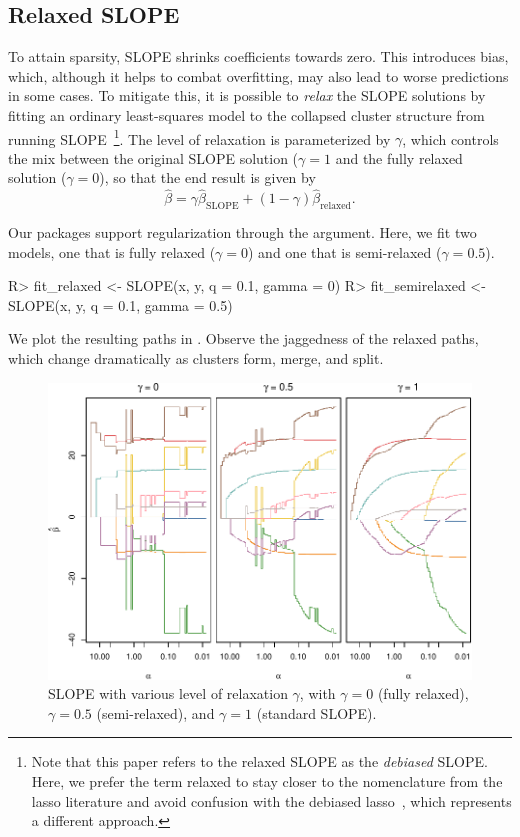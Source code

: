\documentclass[article]{jss}
\makeatletter
\let\Cref\crtCref
\let\natwidth\Gin@nat@width
\makeatother
\begin{document}

\subsection{Relaxed SLOPE}

To attain sparsity, SLOPE shrinks coefficients towards zero. This introduces
bias, which, although it helps to combat overfitting, may also lead to
worse predictions in some cases. To mitigate this, it is possible
to \emph{relax} the SLOPE solutions by fitting an ordinary least-squares
model to the collapsed cluster structure from running SLOPE~\citep{skalski2022}\footnote{
  Note that this paper refers to the relaxed SLOPE as the \emph{debiased} SLOPE. Here,
  we prefer the term relaxed to stay closer to the nomenclature from the lasso literature and
  avoid confusion with the debiased lasso~\citep{geer2014}, which represents a different approach.}.
The level of relaxation is parameterized by \(\gamma\), which controls the mix between the
original SLOPE solution (\(\gamma = 1\) and the fully relaxed
solution (\(\gamma = 0\)), so that
the end result is given by
\[
  \hat{\beta} = \gamma \hat{\beta}_\text{SLOPE} + (1 - \gamma) \hat{\beta}_\text{relaxed}.
\]

Our packages support regularization through the  argument.
Here, we fit two models, one that is fully relaxed
(\(\gamma = 0\)) and one that is semi-relaxed (\(\gamma = 0.5\)).

\begin{Code}
R> fit_relaxed <- SLOPE(x, y, q = 0.1, gamma = 0)
R> fit_semirelaxed <- SLOPE(x, y, q = 0.1, gamma = 0.5)
\end{Code}

We plot the resulting paths in \Cref{fig:relaxed-slope}. Observe
the jaggedness of the relaxed paths, which change dramatically
as clusters form, merge, and split.

\begin{figure}[tp]
  \centering
  \includegraphics[width=\natwidth]{images/slope-relaxed.pdf}
  \caption{%
    SLOPE with various level of relaxation \(\gamma\), with
    \(\gamma = 0\) (fully relaxed), \(\gamma = 0.5\) (semi-relaxed),
    and \(\gamma = 1\) (standard SLOPE).
  }
  \label{fig:relaxed-slope}
\end{figure}
\end{document}
